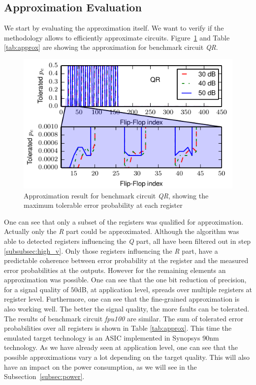 \documentclass[conference]{IEEEtran}
\begin{document}
\subsection{Approximation Evaluation}
We start by evaluating the approximation itself. We want to verify if the methodology allows to efficiently approximate circuits.
Figure~\ref{fig:optimization_qr} and Table \ref{tab:approx} are showing the approximation for benchmark circuit \emph{QR}. 
\begin{figure}[htb]
  \centering
  \includegraphics[width=.5\textwidth]{figs/optimization_qr}
  \caption{Approximation result for benchmark circuit \emph{QR}, showing the maximum tolerable error probability at each register}
  \label{fig:optimization_qr}
\end{figure}
One can see that only a subset of the registers was qualified for approximation. Actually only the \emph{R} part could be approximated. Although the algorithm was able to detected registers influencing the \emph{Q} part, all have been filtered out in step \ref{subsubsec:high_v}. Only those registers influencing the \emph{R} part, have a predictable coherence between error probability at the register and the measured error probabilities at the outputs. However for the remaining elements an approximation was possible. One can see that the one bit reduction of precision, for a signal quality of $50$dB, at application level, spreads over multiple registers at register level. Furthermore, one can see that the fine-grained approximation is also working well. The better the signal quality, the more faults can be tolerated.
The results of benchmark circuit \emph{fpu100} are similar. The sum of tolerated error probabilities over all registers is shown in Table \ref{tab:approx}. This time the emulated target technology is an ASIC implemented in Synopsys 90nm technology. As we have already seen at application level, one can see that the possible approximations vary a lot depending on the target quality. This will also have an impact on the power consumption, as we will see in the Subsection~\ref{subsec:power}.
\end{document}
